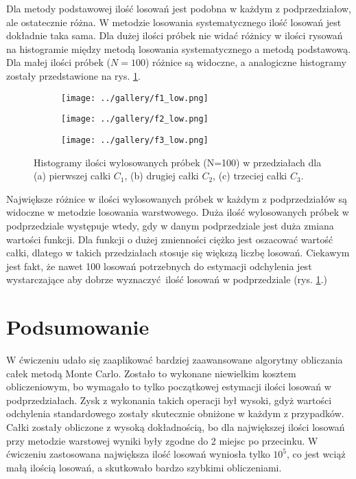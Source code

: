 \documentclass[a4paper, 12pt]{article}
\begin{document}
\noaka Dla metody podstawowej ilość losowań jest podobna w każdym z podprzedziałow, ale ostatecznie różna. 
W metodzie losowania systematycznego ilość losowań jest dokładnie taka sama.
Dla dużej ilości próbek nie widać różnicy w ilości rysowań na histogramie między metodą losowania systematycznego a metodą podstawową.
Dla małej ilości próbek ($N=100$) różnice są widoczne, a analogiczne histogramy zostały przedstawione na rys. \ref{fig:hist_2}.
\begin{figure}[H]
    \centering
    \begin{subfigure}{0.49\textwidth}
        \texttt{[image: ../gallery/f1\_low.png]}
        \caption{}
    \end{subfigure}
    \begin{subfigure}{0.49\textwidth}
        \texttt{[image: ../gallery/f2\_low.png]}
        \caption{}
    \end{subfigure}
    \begin{subfigure}{0.49\textwidth}
        \texttt{[image: ../gallery/f3\_low.png]}
        \caption{}
    \end{subfigure}
    \caption{Histogramy ilości wylosowanych próbek (N=100) w przedziałach dla (a) pierwszej całki $C_1$, (b) drugiej całki $C_2$, (c) trzeciej całki $C_3$.}
    \label{fig:hist_2}
\end{figure}

\noaka Największe różnice w ilości wylosowanych próbek w każdym z podprzedziałów są widoczne w metodzie losowania warstwowego.
Duża ilość wylosowanych próbek w podprzedziale występuje wtedy, gdy w danym podprzedziale jest duża zmiana wartości funkcji.
Dla funkcji o dużej zmienności ciężko jest oszacować wartość całki, dlatego w takich przedziałach stosuje się większą liczbę losowań.
Ciekawym jest fakt, że nawet 100 losowań potrzebnych do estymacji odchylenia jest wystarczające aby dobrze wyznaczyć ilość losowań w podprzedziale (rys. \ref{fig:hist_2}.)

\section{Podsumowanie}

W ćwiczeniu udało się zaaplikować bardziej zaawansowane algorytmy obliczania całek metodą Monte Carlo.
Zostało to wykonane niewielkim kosztem obliczeniowym, bo wymagało to tylko początkowej estymacji ilości losowań w podprzedziałach.
Zysk z wykonania takich operacji był wysoki, gdyż wartości odchylenia standardowego zostały skutecznie obniżone w każdym z przypadków.
Całki zostały obliczone z wysoką dokładnością, bo dla największej ilości losowań przy metodzie warstowej wyniki były zgodne do 2 miejsc po przecinku.
W ćwiczeniu zastosowana największa ilość losowań wyniosła tylko $10^5$, co jest wciąż małą ilością losowań, a skutkowało bardzo szybkimi obliczeniami.
\end{document}

